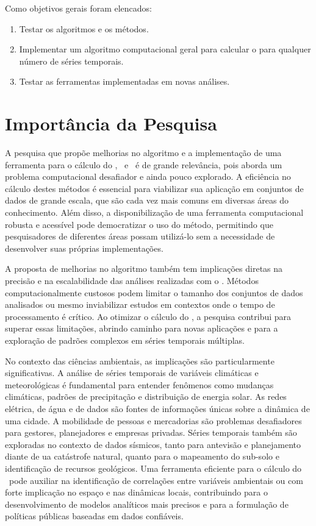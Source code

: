 Como objetivos gerais foram elencados:

\begin{enumerate}
    \label{enum:obj_espec}
    \item  Testar os algoritmos e os métodos.
    \item Implementar um algoritmo computacional geral para calcular o \dmc para qualquer número de séries temporais.
    \item Testar as ferramentas implementadas em novas análises.
\end{enumerate}

\section{Importância da Pesquisa}
\label{sec:justificativa}

A pesquisa que propõe melhorias no algoritmo e a implementação de uma ferramenta para o cálculo do \dcca, \pdcca~e \dmc~é de grande relevância, pois aborda um problema computacional desafiador e ainda pouco explorado. A eficiência no cálculo destes métodos é essencial para viabilizar sua aplicação em conjuntos de dados de grande escala, que são cada vez mais comuns em diversas áreas do conhecimento. Além disso, a disponibilização de uma ferramenta computacional robusta e acessível pode democratizar o uso do método, permitindo que pesquisadores de diferentes áreas possam utilizá-lo sem a necessidade de desenvolver suas próprias implementações.

A proposta de melhorias no algoritmo também tem implicações diretas na precisão e na escalabilidade das análises realizadas com o \dmc. Métodos computacionalmente custosos podem limitar o tamanho dos conjuntos de dados analisados ou mesmo inviabilizar estudos em contextos onde o tempo de processamento é crítico. Ao otimizar o cálculo do \dmc, a pesquisa contribui para superar essas limitações, abrindo caminho para novas aplicações e para a exploração de padrões complexos em séries temporais múltiplas.

No contexto das ciências ambientais, as implicações são particularmente significativas. A análise de séries temporais de variáveis climáticas e meteorológicas é fundamental para entender fenômenos como mudanças climáticas, padrões de precipitação e distribuição de energia solar. As redes elétrica, de água e de dados são fontes de informações únicas sobre a dinâmica de uma cidade. A mobilidade de pessoas e mercadorias são problemas desafiadores para gestores, planejadores e empresas privadas. Séries temporais também são exploradas no contexto de dados sísmicos, tanto para antevisão e planejamento diante de ua catástrofe natural, quanto para o mapeamento do sub-solo e identificação de recursos geológicos. Uma ferramenta eficiente para o cálculo do \dmc~pode auxiliar na identificação de correlações entre variáveis ambientais ou com forte implicação no espaço e nas dinâmicas locais, contribuindo para o desenvolvimento de modelos analíticos mais precisos e para a formulação de políticas públicas baseadas em dados confiáveis.

